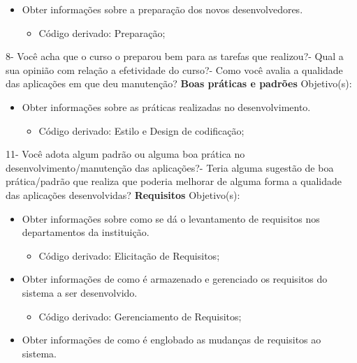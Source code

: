 \begin{anexosenv}
\begin{itemize}
\item Obter informações sobre a preparação dos novos desenvolvedores.
\begin{itemize}
\item Código derivado: Preparação;
\end{itemize}
\end{itemize}
    8- Você acha que o curso o preparou bem para as tarefas que realizou?- Qual a sua opinião com relação a efetividade do curso?- Como você avalia a qualidade das aplicações em que deu manutenção?\newline
\newline
\textbf{Boas práticas e padrões}\newline\newline
Objetivo(s):
\begin{itemize}
\item Obter informações sobre as práticas realizadas no desenvolvimento.
\begin{itemize}
\item Código derivado: Estilo e Design de codificação;
\end{itemize}
\end{itemize}
	11- Você adota algum padrão ou alguma boa prática no desenvolvimento/manutenção das aplicações?- Teria alguma sugestão de boa prática/padrão que realiza que poderia melhorar de alguma forma a qualidade das aplicações desenvolvidas?\newline
    \newline
\textbf{Requisitos}\newline\newline
Objetivo(s):
\begin{itemize}
\item Obter informações sobre como se dá o levantamento de requisitos nos departamentos da instituição.
\begin{itemize}
\item Código derivado: Elicitação de Requisitos;
\end{itemize}
\item Obter informações de como é armazenado e gerenciado os requisitos do sistema a ser desenvolvido.
\begin{itemize}
\item Código derivado: Gerenciamento de Requisitos;
\end{itemize}
\item Obter informações de como é englobado as mudanças de requisitos ao sistema.

\end{itemize}
\end{anexosenv}
